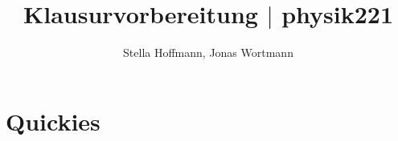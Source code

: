 \documentclass[a4paper,12pt]{article}
\numberwithin{equation}{section}
\begin{document}

\title{Klausurvorbereitung $|$ physik221}
\author{Stella Hoffmann, Jonas Wortmann}
\maketitle
{}


\newpage


\fancyhead[L]{\thepage}
\fancyfoot[C]{}

\tableofcontents


\newpage


\fancyhead[R]{\leftmark\\\rightmark}

\section{Quickies}
\end{document}
